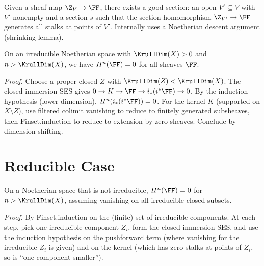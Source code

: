 \begin{lemma}\label{lem:exists_good_section}
  \leanok
  Given a sheaf map $\Z_V \to \FF$, there exists a good section: an open
  $V' \subseteq V$ with $V'$ nonempty and a section $s$ such that the section
  homomorphism $\Z_{V'} \to \FF$ generates all stalks at points of $V'$.
  Internally uses a Noetherian descent argument (shrinking lemma).
\end{lemma}

\begin{theorem}\label{thm:IrreduciblePosVanishing}
  \leanok
  On an irreducible Noetherian space with $\KrullDim(X) > 0$ and
  $n > \KrullDim(X)$, we have $H^n(\FF) = 0$ for all sheaves $\FF$.

  \emph{Proof.} Choose a proper closed $Z$ with $\KrullDim(Z) < \KrullDim(X)$.
  The closed immersion SES gives $0 \to K \to \FF \to i_*(i^*\FF) \to 0$.
  By the induction hypothesis (lower dimension), $H^n(i_*(i^*\FF)) = 0$.
  For the kernel $K$ (supported on $X \setminus Z$), use
  filtered colimit vanishing to reduce to finitely generated subsheaves,
  then Finset.induction to reduce to extension-by-zero sheaves.
  Conclude by dimension shifting.
\end{theorem}


\chapter{Reducible Case}\label{ch:reducible}

\begin{theorem}\label{thm:ReducibleVanishing}
  \leanok
  On a Noetherian space that is not irreducible, $H^n(\FF) = 0$ for $n > \KrullDim(X)$,
  assuming vanishing on all irreducible closed subsets.

  \emph{Proof.} By Finset.induction on the (finite) set of irreducible components.
  At each step, pick one irreducible component $Z_i$, form the closed immersion
  SES, and use the induction hypothesis on the pushforward term (where vanishing
  for the irreducible $Z_i$ is given) and on the kernel (which has zero stalks at
  points of $Z_i$, so is ``one component smaller'').
\end{theorem}



